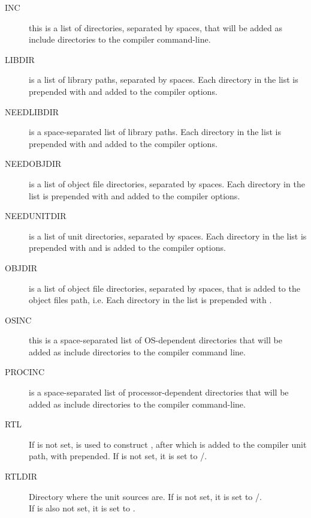 \documentclass{report}
\begin{document}
\begin{description}
\item[INC] this is a list of directories, separated by spaces, that will
be added as include directories to the compiler command-line.

\item[LIBDIR] is a list of library paths, separated by spaces. Each
directory in the list is prepended with  and added to the
compiler options.

\item[NEEDLIBDIR] is a space-separated list of library paths. Each
directory in the list is
prepended with  and added to the compiler options.

\item[NEEDOBJDIR] is a list of object file directories, separated by
 spaces. Each directory in the list is prepended with  and
added to the compiler options.

\item[NEEDUNITDIR] is a list of unit directories, separated by spaces.
Each directory in the list is prepended with  and is added to the
compiler options.

\item[OBJDIR] is a list of object file directories, separated by spaces, that is
added to the object files path, i.e. Each directory in the list is prepended with
.

\item[OSINC] this is a space-separated list of OS-dependent directories
that will be added as include directories to the compiler command line.

\item[PROCINC] is a space-separated list of processor-dependent directories
that will be added as include directories to the compiler command-line.

\item[RTL] If  is not set,  is used to construct
, after which  is added to the compiler unit
path, with  prepended. If  is not set, it is set
 to /.

\item[RTLDIR] Directory where the  unit sources are.
If  is not set, it is set to /. \\
If  is also not set, it is set to .



\end{description}
\end{document}
